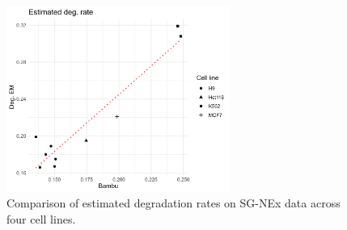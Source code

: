 \begin{figure}
    \centering
    \includegraphics[width=0.65\textwidth]{figures/real-deg-rate.png}
    \caption[Comparison of estimated degradation rates on SG-NEx data]{Comparison of estimated degradation rates on SG-NEx data across four cell lines.}
    \label{fig:real-deg-rate}
\end{figure}

